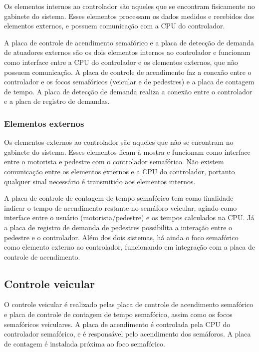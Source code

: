 Os elementos internos ao controlador são aqueles que se encontram fisicamente no gabinete do sistema. Esses elementos processam os dados medidos e recebidos dos elementos externos, e possuem comunicação com a \ac{CPU} do controlador.

A placa de controle de acendimento semafórico e a placa de detecção de demanda de atuadores externos são os dois elementos internos ao controlador e funcionam como interface entre a \ac{CPU} do controlador e os elementos externos, que não possuem comunicação.
A placa de controle de acendimento faz a conexão entre o controlador e os focos semafóricos (veicular e de pedestres) e a placa de contagem de tempo. A placa de detecção de demanda realiza a conexão entre o controlador e a placa de registro de demandas.

\subsubsection{Elementos externos}

Os elementos externos ao controlador são aqueles que não se encontram no gabinete do sistema. Esses elementos ficam à mostra e funcionam como interface entre o motorista e pedestre com o controlador semafórico. Não existem comunicação entre os elementos externos e a \ac{CPU} do controlador, portanto qualquer sinal necessário é transmitido aos elementos internos.

A placa de controle de contagem de tempo semafórico tem como finalidade indicar o tempo de acendimento restante no semáforo veicular, agindo como interface entre o usuário (motorista/pedestre) e os tempos calculados na \ac{CPU}. Já a placa de registro de demanda de pedestres possibilita a interação entre o pedestre e o controlador. Além dos dois sistemas, há ainda o foco semafórico como elemento externo ao controlador, funcionando em integração com a placa de controle de acendimento.

\subsection{Controle veicular}

O controle veicular é realizado pelas placa de controle de acendimento semafórico e placa de controle de contagem de tempo semafórico, assim como os focos semafóricos veiculares. A placa de acendimento é controlada pela \ac{CPU} do controlador semafórico, e é responsável pelo acendimento dos semáforos. A placa de contagem é instalada próxima ao foco semafórico.


